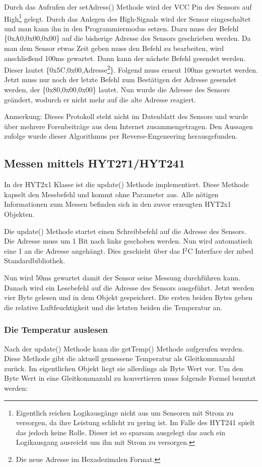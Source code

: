 			\newpage
			Durch das Aufrufen der setAdress() Methode wird der VCC Pin des Sensors auf High\footnote{Eigentlich reichen Logikausgänge nicht aus um Sensoren mit Strom zu versorgen, da ihre Leistung schlicht zu gering ist. Im Falle des HYT241 spielt das jedoch keine Rolle. Dieser ist so sparsam ausgelegt das auch ein Logikausgang ausreicht um ihn mit Strom zu versorgen.} gelegt. Durch das Anlegen des High-Signals wird der Sensor eingeschaltet und man kann ihn in den Programmiermodus setzen. Dazu muss der Befehl \{0xA0,0x00,0x00\} auf die bisherige Adresse des Sensors geschrieben werden. Da man dem Sensor etwas Zeit geben muss den Befehl zu bearbeiten, wird anschließend 100ms gewartet. Dann kann der nächste Befehl gesendet werden. Dieser lautet \{0x5C,0x00,Adresse\footnote{Die neue Adresse im Hexadezimalen Format.}\}. Folgend muss erneut 100ms gewartet werden. Jetzt muss nur noch der letzte Befehl zum Bestätigen der Adresse gesendet werden, der \{0x80,0x00,0x00\} lautet. Nun wurde die Adresse des Sensors geändert, wodurch er nicht mehr auf die alte Adresse reagiert.
			
			Anmerkung: Dieses Protokoll steht nicht im Datenblatt des Sensors und wurde über mehrere Forenbeiträge aus dem Internet zusammengetragen. Den Aussagen zufolge wurde dieser Algorithmus per Reverse-Engeneering herausgefunden.
		\subsection{Messen mittels HYT271/HYT241}
			In der HYT2x1 Klasse ist die update() Methode implementiert. Diese Methode kapselt den Messbefehl und kommt ohne Parameter aus. Alle nötigen Informationen zum Messen befinden sich in den zuvor erzeugten HYT2x1 Objekten.
			
			Die update() Methode startet einen Schreibbefehl auf die Adresse des Sensors. Die Adresse muss um 1 Bit nach links geschoben werden. Nun wird automatisch eine 1 an die Adresse angehängt. Dies geschieht über das I$^{2}$C Interface der mbed Standardbibliothek.
			
			Nun wird 50ms gewartet damit der Sensor seine Messung durchführen kann. Danach wird ein Lesebefehl auf die Adresse des Sensors ausgeführt. Jetzt werden vier Byte gelesen und in dem Objekt gespeichert. Die ersten beiden Bytes geben die relative Luftfeuchtigkeit und die letzten beiden die Temperatur an.
			\subsubsection{Die Temperatur auslesen}
				Nach der update() Methode kann die getTemp() Methode aufgerufen werden. Diese Methode gibt die aktuell gemessene Temperatur als Gleitkommazahl zurück. Im eigentlichen  Objekt liegt sie allerdings als Byte Wert vor. Um den Byte Wert in eine Gleitkommazahl zu konvertieren muss folgende Formel benutzt werden:
				
